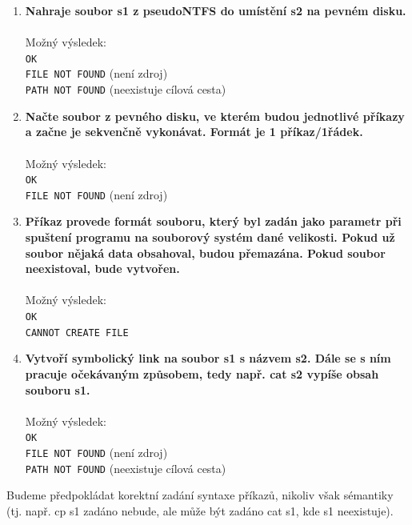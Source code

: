 \documentclass[
11pt,
a4paper,
pdftex,
czech,
titlepage
]{report}
\begin{document}
\begin{enumerate}[label=\textbf{\arabic*}.]
\item \textbf{Nahraje soubor s1 z pseudoNTFS do umístění s2 na pevném disku.}\\[0,2cm]
\noindent {}\\[0.5\baselineskip]
Možný výsledek:\\
\texttt{OK}\\
\texttt{FILE NOT FOUND} (není zdroj)\\
\texttt{PATH NOT FOUND} (neexistuje cílová cesta)\\

\item \textbf{Načte soubor z pevného disku, ve kterém budou jednotlivé příkazy a začne je sekvenčně vykonávat. Formát je 1 příkaz/1řádek.}\\[0,2cm]
\noindent {}\\[0.5\baselineskip]
Možný výsledek:\\
\texttt{OK}\\
\texttt{FILE NOT FOUND} (není zdroj)\\

\item \textbf{Příkaz provede formát souboru, který byl zadán jako parametr při spuštení programu na souborový systém dané velikosti. Pokud už soubor nějaká data obsahoval, budou přemazána. Pokud soubor neexistoval, bude vytvořen.}\\[0,2cm]
\noindent {}\\[0.5\baselineskip]
Možný výsledek:\\
\texttt{OK}\\
\texttt{CANNOT CREATE FILE}\\

\item \textbf{Vytvoří symbolický link na soubor s1 s názvem s2. Dále se s ním pracuje očekávaným způsobem, tedy např. cat s2 vypíše obsah souboru s1.}\\[0,2cm]
\noindent {}\\[0.5\baselineskip]
Možný výsledek:\\
\texttt{OK}\\
\texttt{FILE NOT FOUND} (není zdroj)\\
\texttt{PATH NOT FOUND} (neexistuje cílová cesta)\\
\end{enumerate}

\noindent Budeme předpokládat korektní zadání syntaxe příkazů, nikoliv však sémantiky (tj. např. cp s1 zadáno nebude, ale může být zadáno cat s1, kde s1 neexistuje).
\end{document}
